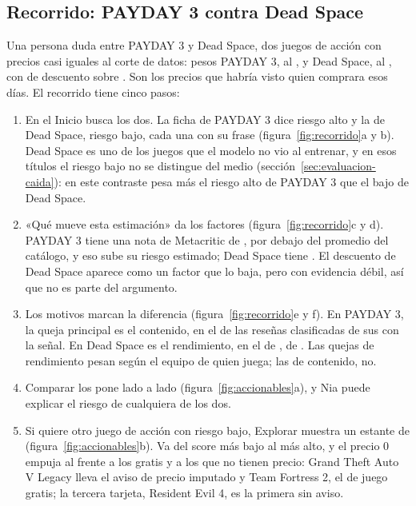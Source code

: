 \subsection{Recorrido: PAYDAY 3 contra Dead Space}\label{sec:estrategia-recorrido}

Una persona duda entre PAYDAY 3 y Dead Space, dos juegos de acción con precios casi iguales al corte
de datos: \cifraPaydayPrecio{} pesos PAYDAY 3, al \cifraPaydayFechaPrecio{}, y
\cifraDeadSpacePrecio{} Dead Space, al \cifraDeadSpaceFechaPrecio{}, con \cifraDeadSpaceDescuento{}
de descuento sobre \cifraDeadSpacePrecioInicial{}. Son los precios que habría visto quien comprara
esos días. El recorrido tiene cinco pasos:
\begin{enumerate}
  \item En el Inicio busca los dos. La ficha de PAYDAY 3 dice riesgo alto y la de Dead Space, riesgo
  bajo, cada una con su frase (figura~\ref{fig:recorrido}a y b). Dead Space es uno de los
  \cifraJuegosExternos{} juegos que el modelo no vio al entrenar, y en esos títulos el riesgo bajo
  no se distingue del medio (sección~\ref{sec:evaluacion-caida}): en este contraste pesa más el
  riesgo alto de PAYDAY 3 que el bajo de Dead Space.
  \item «Qué mueve esta estimación» da los factores (figura~\ref{fig:recorrido}c y d). PAYDAY 3
  tiene una nota de Metacritic de \cifraPaydayMetacritic{}, por debajo del promedio del catálogo, y
  eso sube su riesgo estimado; Dead Space tiene \cifraDeadSpaceMetacritic{}. El descuento de Dead
  Space aparece como un factor que lo baja, pero con evidencia débil, así que no es parte del
  argumento.
  \item Los motivos marcan la diferencia (figura~\ref{fig:recorrido}e y f). En PAYDAY 3, la queja
  principal es el contenido, en el \cifraPaydayMotivoPrincipal{} de las
  \cifraPaydayClasificadas{} reseñas clasificadas de sus \cifraPaydayCasos{} con la señal. En Dead
  Space es el rendimiento, en el \cifraDeadSpaceMotivoPrincipal{} de \cifraDeadSpaceClasificadas{},
  de \cifraDeadSpaceCasos{}. Las quejas de rendimiento pesan según el equipo de quien juega; las de
  contenido, no.
  \item Comparar los pone lado a lado (figura~\ref{fig:accionables}a), y Nia puede explicar el
  riesgo de cualquiera de los dos.
  \item Si quiere otro juego de acción con riesgo bajo, Explorar muestra un estante de
  \cifraEstanteAccionBajo{} (figura~\ref{fig:accionables}b). Va del score más bajo al más alto, y
  el precio 0 empuja al frente a los gratis y a los que no tienen precio: Grand Theft Auto V Legacy
  lleva el aviso de precio imputado y Team Fortress 2, el de juego gratis; la tercera tarjeta,
  Resident Evil 4, es la primera sin aviso.
\end{enumerate}

